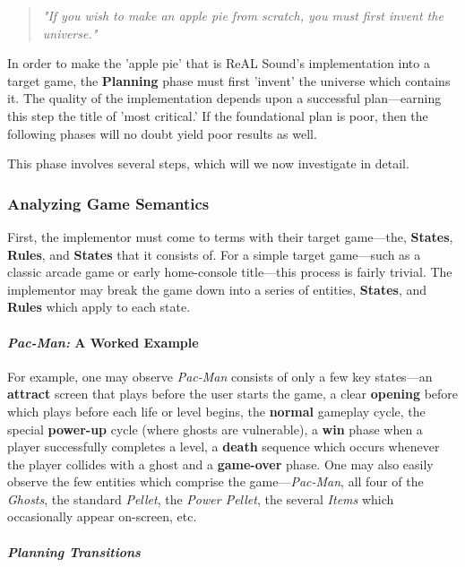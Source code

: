 \documentclass{report}
\newcommand{\rs}{ReAL Sound\xspace}
\newcommand{\plan}{\textbf{Planning}\xspace}
\newcommand{\state}[1]{\textbf{#1}}
\newcommand{\rules}{\textbf{Rules}\xspace}
\newcommand{\imp}{implementor\xspace}
\begin{document}
\begin{quote}
    
\emph{"If you wish to make an apple pie from scratch, you must first invent the universe."}
    
\end{quote}

In order to make the 'apple pie' that is \rs's implementation into a target game, the \plan phase must first 'invent' the universe which contains it. The quality of the implementation depends upon a successful plan---earning this step the title of 'most critical.' If the foundational plan is poor, then the following phases will no doubt yield poor results as well. 

This phase involves several steps, which will we now investigate in detail.

\subsubsection{Analyzing Game Semantics}

First, the \imp must come to terms with their target game---the, \state{States}, \rules, and \state{States} that it consists of. For a simple target game---such as a classic arcade game or early home-console title---this process is fairly trivial. The \imp may break the game down into a series of entities, \state{States}, and \rules which apply to each state.

\paragraph{\emph{Pac-Man:} A Worked Example }

For example, one may observe \emph{Pac-Man} consists of only a few key states---an \state{attract} screen that plays before the user starts the game, a clear \state{opening} before which plays before each life or level begins, the \state{normal} gameplay cycle, the special \state{power-up} cycle (where ghosts are vulnerable), a \state{win} phase when a player successfully completes a level, a \state{death} sequence which occurs whenever the player collides with a ghost and a \state{game-over} phase. One may also easily observe the few entities which comprise the game---\emph{Pac-Man}, all four of the \emph{Ghosts}, the standard \emph{Pellet}, the \emph{Power Pellet}, the several \emph{Items} which occasionally appear on-screen, etc.

\subparagraph{Planning Transitions}
\end{document}
